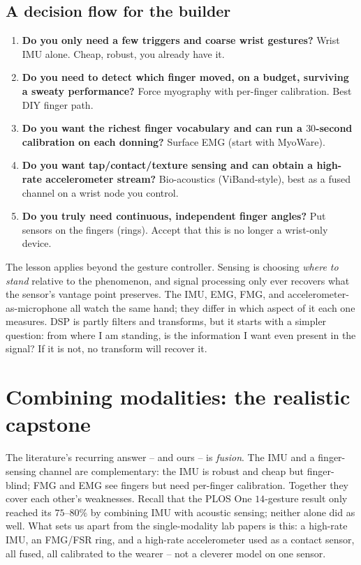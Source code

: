 \subsection{A decision flow for the builder}
\label{ch37:decision-flow}

\begin{enumerate}
\item \textbf{Do you only need a few triggers and coarse wrist gestures?}
Wrist IMU alone. Cheap, robust, you already have it.
\item \textbf{Do you need to detect which finger moved, on a budget, surviving a
sweaty performance?} Force myography with per-finger calibration. Best DIY finger
path.
\item \textbf{Do you want the richest finger vocabulary and can run a $30$-second
calibration on each donning?} Surface EMG (start with MyoWare).
\item \textbf{Do you want tap/contact/texture sensing and can obtain a high-rate
accelerometer stream?} Bio-acoustics (ViBand-style), best as a fused channel on a
wrist node you control.
\item \textbf{Do you truly need continuous, independent finger angles?} Put sensors on
the fingers (rings). Accept that this is no longer a wrist-only device.
\end{enumerate}

\begin{aestheticbox}
The lesson applies beyond the gesture controller. Sensing is choosing \emph{where to
stand} relative to the phenomenon, and signal processing only ever recovers what the
sensor's vantage point preserves. The IMU, EMG, FMG, and accelerometer-as-microphone
all watch the same hand; they differ in which aspect of it each one measures.
DSP is partly filters and transforms, but it starts with a simpler
question: from where I am standing, is the information I want even
present in the signal? If it is not, no transform will recover it.
\end{aestheticbox}

\section{Combining modalities: the realistic capstone}
\label{ch37:fusion}

The literature's recurring answer -- and ours -- is \emph{fusion}. The IMU and a
finger-sensing channel are complementary: the IMU is robust and cheap but finger-blind;
FMG and EMG see fingers but need per-finger calibration. Together they cover each
other's weaknesses. Recall that the PLOS One $14$-gesture result only reached its
$75$--$80\%$ by combining IMU with acoustic sensing; neither alone did as well. What
sets us apart from the single-modality lab papers is this: a high-rate IMU, an FMG/FSR
ring, and a high-rate accelerometer used as a contact sensor, all fused, all
calibrated to the wearer -- not a cleverer model on one sensor.

